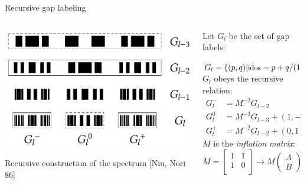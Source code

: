 \documentclass[xcolor=x11names,compress,professionalfonts]{beamer}
\renewcommand{\(}{\begin{columns}}
\renewcommand{\)}{\end{columns}}
\newcommand{\<}[1]{\begin{column}{#1}}
\renewcommand{\>}{\end{column}}
\newcommand{\id}{\ensuremath{\text{idos}}}
\newcommand{\sub}{\ensuremath{M}}
\begin{document}
\begin{frame}{Recursive gap labeling}

\begin{columns}
\newcommand{\s}{.2}

  \begin{column}{5cm}
  \centering
     \includegraphics[scale=.4]{img/recursive_construction_spectrum.pdf}
     
	\small{Recursive construction of the spectrum {\scriptsize [Niu, Nori 86]}}
	
  \end{column}


  \begin{column}{5cm}
Let $G_l$ be the set of gap labels:

$\small{G_l = \{(p,q)| \id = p+q/(1+\alpha)\}}$
$G_l$ obeys the recursive relation:
		\begin{align*}
			G_{l}^{-} &= \sub^{-2} G_{l-2} \\
			G_{l}^0 &= \sub^{-3} G_{l-3} + (1, -1) \\
			G_{l}^+ &= \sub^{-2} G_{l-2} + (0,1)
		\end{align*}
$M$ is the \emph{inflation matrix}:
\[
			\sub = \begin{bmatrix}
				1 & 1\\
				1 & 0\\
			\end{bmatrix}
			\rightarrow
			M
			\begin{pmatrix}
			A \\
			B
			\end{pmatrix}
			=
			\begin{pmatrix}
			AB \\
			A
			\end{pmatrix}
			\]
			

\end{column}
\end{columns}
\end{frame}
\end{document}
